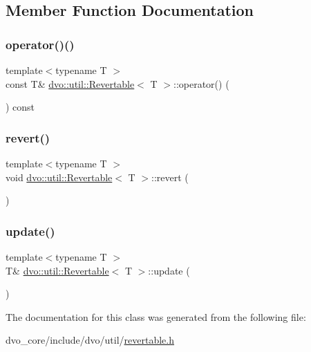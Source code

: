 \subsection{Member Function Documentation}
\mbox{\label{classdvo_1_1util_1_1_revertable_ae583fea5c2d9f3e248f8f1d7bcdfd3d3}} 
\subsubsection{\texorpdfstring{operator()()}{operator()()}}
{\footnotesize\ttfamily template$<$typename T $>$ \\
const T\& \mbox{\hyperlink{classdvo_1_1util_1_1_revertable}{dvo\+::util\+::\+Revertable}}$<$ T $>$\+::operator() (\begin{DoxyParamCaption}{ }\end{DoxyParamCaption}) const\hspace{0.3cm}{\ttfamily [inline]}}

\mbox{\label{classdvo_1_1util_1_1_revertable_ac4130b746441cb5d449d0ae24f6889f3}} 
\subsubsection{\texorpdfstring{revert()}{revert()}}
{\footnotesize\ttfamily template$<$typename T $>$ \\
void \mbox{\hyperlink{classdvo_1_1util_1_1_revertable}{dvo\+::util\+::\+Revertable}}$<$ T $>$\+::revert (\begin{DoxyParamCaption}{ }\end{DoxyParamCaption})\hspace{0.3cm}{\ttfamily [inline]}}

\mbox{\label{classdvo_1_1util_1_1_revertable_a09344cd96395e5e63ab57d33dbab55cf}} 
\subsubsection{\texorpdfstring{update()}{update()}}
{\footnotesize\ttfamily template$<$typename T $>$ \\
T\& \mbox{\hyperlink{classdvo_1_1util_1_1_revertable}{dvo\+::util\+::\+Revertable}}$<$ T $>$\+::update (\begin{DoxyParamCaption}{ }\end{DoxyParamCaption})\hspace{0.3cm}{\ttfamily [inline]}}



The documentation for this class was generated from the following file\+:\begin{DoxyCompactItemize}
\item 
dvo\+\_\+core/include/dvo/util/\mbox{\hyperlink{revertable_8h}{revertable.\+h}}\end{DoxyCompactItemize}
